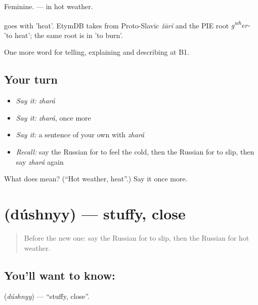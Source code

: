 Feminine. \emph{ } — in hot weather.

\begin{cousinweb}
\emph{} goes with \emph{} 'heat'. EtymDB takes \emph{} from Proto-Slavic \emph{žārĭ} and the PIE root \emph{g\textsuperscript{w}\textsuperscript{h}er-} 'to heat'; the same root is in \emph{} 'to burn'.
\end{cousinweb}

\begin{grammarlens}[title={What you've built}]
One more word for telling, explaining and describing at B1.
\end{grammarlens}

\subsection*{Your turn}
\begin{itemize}
\raggedright
  \item \emph{Say it:} \emph{zhará}
  \item \emph{Say it:} \emph{zhará}, once more
  \item \emph{Say it:} a sentence of your own with \emph{zhará}
  \item \emph{Recall:} say the Russian for to feel the cold, then the Russian for to slip, then say \emph{zhará} again
\end{itemize}

\begin{tcolorbox}[breakable,colback=teal!4,colframe=teal!35!black,title={Before you move on}]
What does  mean? (\textquotedblleft{}Hot weather, heat\textquotedblright{}.) Say it once more.
\end{tcolorbox}
\section[\texorpdfstring{\ru{душный} (dúshnyy)}{душный (dúshnyy)}]{ (dúshnyy) — stuffy, close}

\label{lesson:RU-C468-dushnyy}



\begin{quote}
Before the new one: say the Russian for to slip, then the Russian for hot weather.
\end{quote}

\subsection*{You'll want to know: }
\textbf{} (\emph{dúshnyy}) — \textquotedblleft{}stuffy, close\textquotedblright{}.

